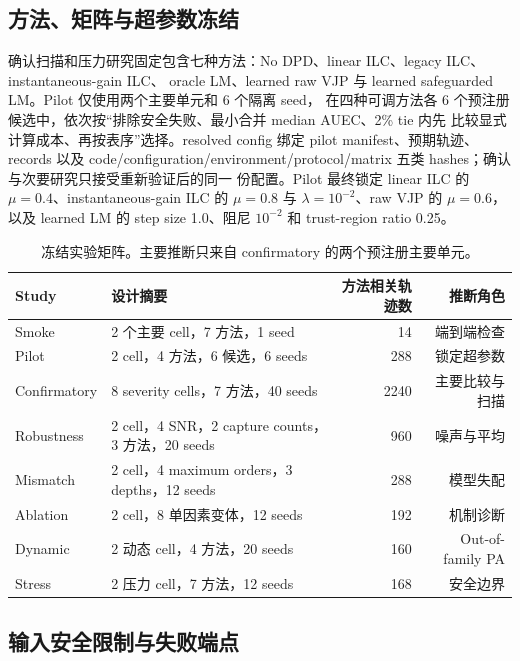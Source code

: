 \documentclass[UTF8,zihao=-4,a4paper]{ctexart}
\begin{document}
\subsection{方法、矩阵与超参数冻结}

确认扫描和压力研究固定包含七种方法：No DPD、linear ILC、legacy ILC、instantaneous-gain ILC、
oracle LM、learned raw VJP 与 learned safeguarded LM。Pilot 仅使用两个主要单元和 6 个隔离 seed，
在四种可调方法各 6 个预注册候选中，依次按“排除安全失败、最小合并 median AUEC、2\% tie 内先
比较显式计算成本、再按表序”选择。resolved config 绑定 pilot manifest、预期轨迹、records 以及
code/configuration/environment/protocol/matrix 五类 hashes；确认与次要研究只接受重新验证后的同一
份配置。Pilot 最终锁定 linear ILC 的 $\mu=0.4$、instantaneous-gain ILC 的 $\mu=0.8$ 与
$\lambda=10^{-2}$、raw VJP 的 $\mu=0.6$，以及 learned LM 的 step size 1.0、阻尼 $10^{-2}$ 和
trust-region ratio 0.25。

\begin{table}[t]
  \centering
  \caption{冻结实验矩阵。主要推断只来自 confirmatory 的两个预注册主要单元。}
  \label{tab:matrix}
  \begin{tabularx}{\linewidth}{lYrr}
    \toprule
    Study & 设计摘要 & 方法相关轨迹数 & 推断角色 \\
    \midrule
    Smoke & 2 个主要 cell，7 方法，1 seed & 14 & 端到端检查 \\
    Pilot & 2 cell，4 方法，6 候选，6 seeds & 288 & 锁定超参数 \\
    Confirmatory & 8 severity cells，7 方法，40 seeds & 2240 & 主要比较与扫描 \\
    Robustness & 2 cell，4 SNR，2 capture counts，3 方法，20 seeds & 960 & 噪声与平均 \\
    Mismatch & 2 cell，4 maximum orders，3 depths，12 seeds & 288 & 模型失配 \\
    Ablation & 2 cell，8 单因素变体，12 seeds & 192 & 机制诊断 \\
    Dynamic & 2 动态 cell，4 方法，20 seeds & 160 & Out-of-family PA \\
    Stress & 2 压力 cell，7 方法，12 seeds & 168 & 安全边界 \\
    \bottomrule
  \end{tabularx}
\end{table}

\subsection{输入安全限制与失败端点}
\end{document}
